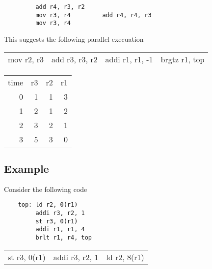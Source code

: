 \documentclass{article}
\begin{document}
\begin{verbatim}
         add r4, r3, r2
         mov r3, r4         add r4, r4, r3
         mov r3, r4
\end{verbatim}

This suggests the following parallel execuation

\begin{tabular}{llll}
mov r2, r3  & add r3, r3, r2 & addi r1, r1, -1 & brgtz r1, top \\
\end{tabular}



\begin{tabular}{rrrr}
time  &r3      & r2   & r1  \\
0     & 1      & 1    & 3   \\
1     & 2      & 1    & 2  \\
2     & 3      & 2    & 1 \\
3     & 5      & 3    & 0 \\
\end{tabular}


\subsection{Example}
Consider the following code

\begin{verbatim}
    top: ld r2, 0(r1)
         addi r3, r2, 1
         st r3, 0(r1)
         addi r1, r1, 4
         brlt r1, r4, top
\end{verbatim}

\begin{tabular}{lll}
st r3, 0(r1) & addi r3, r2, 1 & ld r2, 8(r1) \\
\end{tabular}
\end{document}
